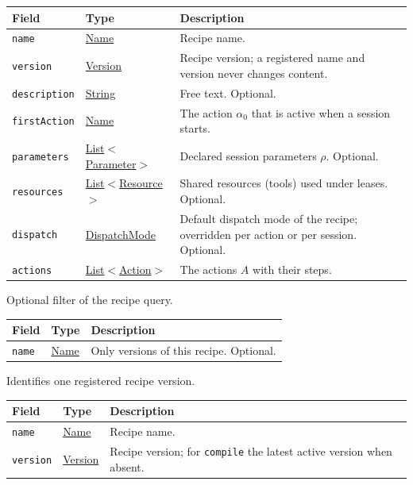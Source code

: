 \documentclass[a4paper]{arrowhead}
\newcommand{\mref}[1]{{\textcolor{ArrowheadPurple}{\hyperref[sec:model:#1]{#1}}}}
\newcommand{\pref}[1]{{\textcolor{ArrowheadGrey}{\hyperref[sec:model:primitives:#1]{#1}}}}
\begin{document}
{\small
\begin{longtable}{|p{3.9cm}|p{4.4cm}|p{7.5cm}|}

\hline
\rowcolor{gray!33} Field & Type & Description \\ \hline
\endhead
\texttt{name} & \pref{Name} & Recipe name. \\ \hline
\texttt{version} & \pref{Version} & Recipe version; a registered name and version never changes content. \\ \hline
\texttt{description} & \pref{String} & Free text. Optional. \\ \hline
\texttt{firstAction} & \pref{Name} & The action $\alpha_0$ that is active when a session starts. \\ \hline
\texttt{parameters} & \pref{List}$<$\mref{Parameter}$>$ & Declared session parameters $\rho$. Optional. \\ \hline
\texttt{resources} & \pref{List}$<$\mref{Resource}$>$ & Shared resources (tools) used under leases. Optional. \\ \hline
\texttt{dispatch} & \mref{DispatchMode} & Default dispatch mode of the recipe; overridden per action or per session. Optional. \\ \hline
\texttt{actions} & \pref{List}$<$\mref{Action}$>$ & The actions $A$ with their steps. \\ \hline
\end{longtable}
}

Optional filter of the recipe query.

{\small
\begin{longtable}{|p{3.9cm}|p{4.4cm}|p{7.5cm}|}

\hline
\rowcolor{gray!33} Field & Type & Description \\ \hline
\endhead
\texttt{name} & \pref{Name} & Only versions of this recipe. Optional. \\ \hline
\end{longtable}
}

Identifies one registered recipe version.

{\small
\begin{longtable}{|p{3.9cm}|p{4.4cm}|p{7.5cm}|}

\hline
\rowcolor{gray!33} Field & Type & Description \\ \hline
\endhead
\texttt{name} & \pref{Name} & Recipe name. \\ \hline
\texttt{version} & \pref{Version} & Recipe version; for \texttt{compile} the latest active version when absent. \\ \hline
\end{longtable}
}
\end{document}
